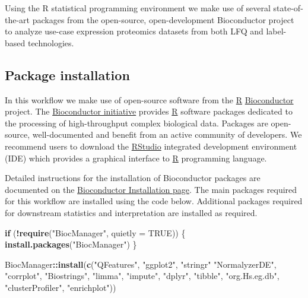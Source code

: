 \documentclass[9pt,a4paper,]{extarticle}
\newenvironment{Shaded}{\begin{snugshade}}{\end{snugshade}}
\newcommand{\AttributeTok}[1]{\textcolor[rgb]{0.13,0.29,0.53}{#1}}
\newcommand{\ConstantTok}[1]{\textcolor[rgb]{0.56,0.35,0.01}{#1}}
\newcommand{\ControlFlowTok}[1]{\textcolor[rgb]{0.13,0.29,0.53}{\textbf{#1}}}
\newcommand{\FunctionTok}[1]{\textcolor[rgb]{0.13,0.29,0.53}{\textbf{#1}}}
\newcommand{\NormalTok}[1]{#1}
\newcommand{\SpecialCharTok}[1]{\textcolor[rgb]{0.81,0.36,0.00}{\textbf{#1}}}
\newcommand{\StringTok}[1]{\textcolor[rgb]{0.31,0.60,0.02}{#1}}
\begin{document}
Using the R statistical programming environment \citep{Rstat} we make use of several
state-of-the-art packages from the open-source, open-development Bioconductor
project \citep{Huber2015} to analyze use-case expression proteomics datasets
\citep{HutchingsData} from both LFQ and label-based technologies.

\subsection{Package installation}\label{package-installation}

In this workflow we make use of open-source software from the
\href{https://www.r-project.org}{R} \href{https://bioconductor.org}{Bioconductor}
\citep{Huber2015} project. The \href{https://bioconductor.org}{Bioconductor initiative}
provides \href{https://www.r-project.org}{R} software packages dedicated
to the processing of high-throughput complex biological data. Packages are
open-source, well-documented and benefit from an active community of developers.
We recommend users to download the
\href{https://posit.co/download/rstudio-desktop/}{RStudio} integrated development
environment (IDE) which provides a graphical interface to
\href{https://www.r-project.org}{R} programming language.

Detailed instructions for the installation of Bioconductor packages are
documented on the \href{http://bioconductor.org/install/}{Bioconductor Installation page}.
The main packages required for this workflow are installed using the code below.
Additional packages required for downstream statistics and interpretation are
installed as required.

\begin{Shaded}
\begin{Highlighting}[]
\ControlFlowTok{if}\NormalTok{ (}\SpecialCharTok{!}\FunctionTok{require}\NormalTok{(}\StringTok{"BiocManager"}\NormalTok{, }\AttributeTok{quietly =} \ConstantTok{TRUE}\NormalTok{)) \{}
  \FunctionTok{install.packages}\NormalTok{(}\StringTok{"BiocManager"}\NormalTok{)}
\NormalTok{\}}

\NormalTok{BiocManager}\SpecialCharTok{::}\FunctionTok{install}\NormalTok{(}\FunctionTok{c}\NormalTok{(}\StringTok{"QFeatures"}\NormalTok{,}
                       \StringTok{"ggplot2"}\NormalTok{,}
                       \StringTok{"stringr"}
                       \StringTok{"NormalyzerDE"}\NormalTok{,}
                       \StringTok{"corrplot"}\NormalTok{,}
                       \StringTok{"Biostrings"}\NormalTok{,}
                       \StringTok{"limma"}\NormalTok{,}
                       \StringTok{"impute"}\NormalTok{,}
                       \StringTok{"dplyr"}\NormalTok{,}
                       \StringTok{"tibble"}\NormalTok{,}
                       \StringTok{"org.Hs.eg.db"}\NormalTok{,}
                       \StringTok{"clusterProfiler"}\NormalTok{,}
                       \StringTok{"enrichplot"}\NormalTok{))}
\end{Highlighting}
\end{Shaded}
\end{document}
